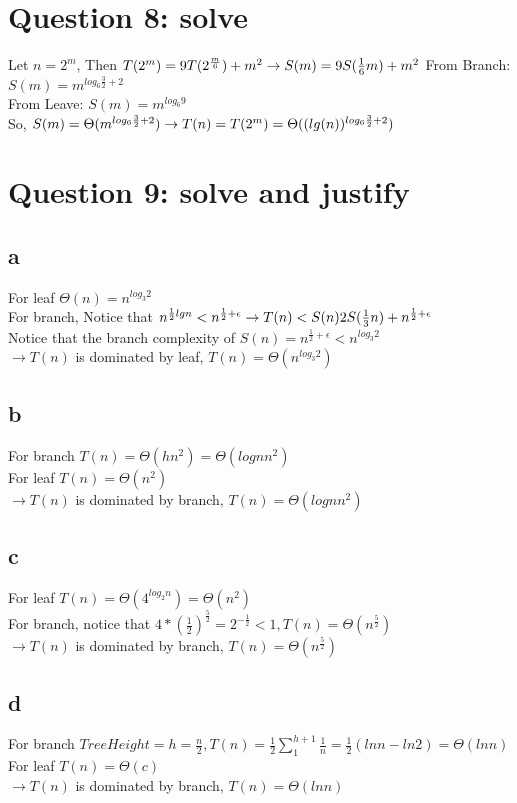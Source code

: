 \documentclass[]{article}
\begin{document}
\section{Question 8: solve}
Let $n = 2^m$, Then $T(2^m) = 9T(2^{\frac{m}{6}}) + m^2\\
\rightarrow S(m) = 9S(\frac{1}{6}m) + m^2\\$
From Branch: $S(m) = m^{log_{6}\frac{3}{2} + 2}$\\
From Leave: $S(m) = m^{log_{6}9}$\\
So, $S(m) = \Theta (m^{log_{6}\frac{3}{2} + 2}) \\
\rightarrow T(n) = T(2^m) = \Theta((lg(n))^{log_{6}\frac{3}{2} + 2})$

\section{Question 9: solve and justify}
\subsection{a}
For leaf $\Theta(n) = n^{log_{3}2}$\\
For branch, Notice that $n^{\frac{1}{2}lgn} < n^{\frac{1}{2} + \epsilon}\\
\rightarrow T(n) < S(n) 2S(\frac{1}{3}n) + n^{\frac{1}{2} + \epsilon}$\\
Notice that the branch complexity of $S(n) = n^{\frac{1}{2}+\epsilon} < n^{log_{3}2}$\\
$\rightarrow T(n)$ is dominated by leaf, $T(n) = \Theta(n^{log_{3}2})$


\subsection{b}
For branch $T(n) = \Theta(hn^2) = \Theta(lognn^2)$\\
For leaf $T(n) = \Theta(n^2)$\\
$\rightarrow T(n)$ is dominated by branch, $T(n) =\Theta(lognn^2)$

\subsection{c}
For leaf $T(n) = \Theta(4^{log_{2}n}) = \Theta(n^2)$\\
For branch, notice that $4*(\frac{1}{2})^{\frac{5}{2}} = 2^{-\frac{1}{2}} < 1, T(n) = \Theta(n^{\frac{5}{2}})$\\
$\rightarrow T(n)$ is dominated by branch, $T(n) =\Theta(n^{\frac{5}{2}})$

\subsection{d}
For branch $TreeHeight = h = \frac{n}{2}, T(n) = \frac{1}{2}\sum_{1}^{h + 1} \frac{1}{n} = \frac{1}{2}(lnn-ln2) = \Theta(lnn)$\\
For leaf $T(n) = \Theta(c)$\\
$\rightarrow T(n)$ is dominated by branch, $T(n) =\Theta(lnn)$
\end{document}
